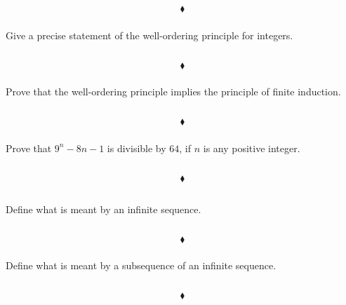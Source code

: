 $$\blacklozenge$$

\subsubsection{}
\begin{tcolorbox}
Give a precise statement of the well-ordering principle for integers. 
\end{tcolorbox}
$$ $$

$$\blacklozenge$$

\subsubsection{}
\begin{tcolorbox}
Prove that the well-ordering principle implies the principle of finite induction. 
\end{tcolorbox}
$$ $$

$$\blacklozenge$$

\subsubsection{}
\begin{tcolorbox}
 Prove that $9^n-8n-1$ is divisible by $64$, if $n$ is any positive integer. 
\end{tcolorbox}
$$ $$

$$\blacklozenge$$


\renewcommand{\thesubsection}{\thesection.\RomanNumeralCaps{8}}
\subsection{}
\subsubsection{}
\begin{tcolorbox}
Define what is meant by an infinite sequence.
\end{tcolorbox}
$$ $$

$$\blacklozenge$$

\subsubsection{}
\begin{tcolorbox}
Define what is meant by a subsequence of an infinite sequence.
\end{tcolorbox}
$$ $$

$$\blacklozenge$$

